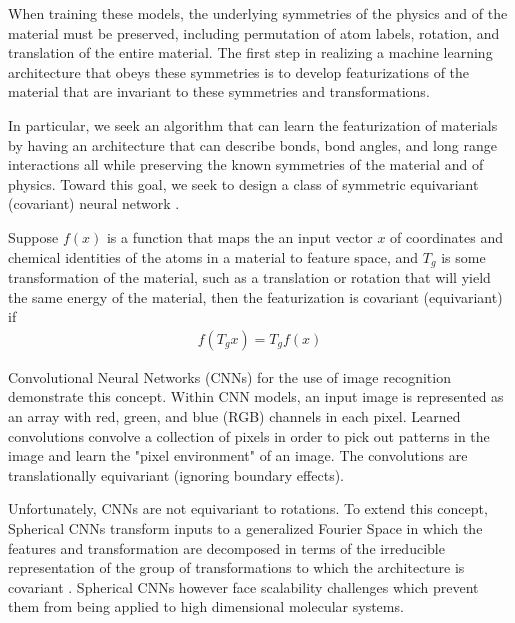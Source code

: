 \documentclass[book.tex]{subfiles}
\begin{document}
When training these models, the underlying symmetries of the physics and of the material must be preserved, including permutation of atom labels, rotation, and translation of the entire material. The first step in realizing a machine learning architecture that obeys these symmetries is to develop featurizations of the material that are invariant to these symmetries and transformations. 

 
In particular, we seek an algorithm that can learn the featurization of materials by having an architecture that can describe bonds, bond angles, and long range interactions all while preserving the known symmetries of the material and of physics. Toward this goal, we seek to design a class of symmetric equivariant (covariant) neural network \cite{anderson2019cormorant}. 

Suppose $f(x)$ is a function that maps the an input vector $x$ of coordinates and chemical identities of the atoms in a material to feature space, and $T_g$ is some transformation of the material, such as a translation or rotation that will yield the same energy of the material, then the featurization is covariant (equivariant) if 
\begin{align}
f(T_g  x) = T_g  f(x)
\end{align}

Convolutional Neural Networks (CNNs) for the use of image recognition demonstrate this concept. Within CNN models, an input image is represented as an array with red, green, and blue (RGB) channels in each pixel. Learned convolutions convolve a collection of pixels in order to pick out patterns in the image and learn the "pixel environment" of an image. The convolutions are translationally equivariant (ignoring boundary effects). 

Unfortunately, CNNs are not equivariant to rotations. To extend this concept, Spherical CNNs transform inputs to a generalized Fourier Space in which the features and transformation are decomposed in terms of the irreducible representation of the group of transformations to which the architecture is covariant  \cite{kondor2018clebsch}. Spherical CNNs however face scalability challenges which prevent them from being applied to high dimensional molecular systems.
\end{document}
